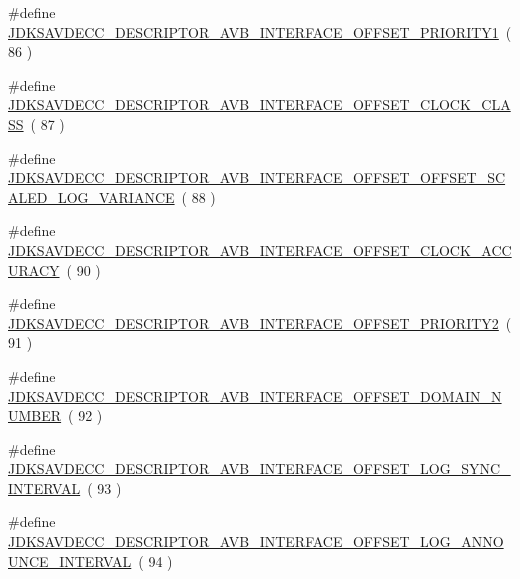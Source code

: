 \begin{DoxyCompactItemize}
\#define \hyperlink{group__descriptor__avb__interface_ga08c367bdbcb7eb2afffcf40741b96c4b}{J\+D\+K\+S\+A\+V\+D\+E\+C\+C\+\_\+\+D\+E\+S\+C\+R\+I\+P\+T\+O\+R\+\_\+\+A\+V\+B\+\_\+\+I\+N\+T\+E\+R\+F\+A\+C\+E\+\_\+\+O\+F\+F\+S\+E\+T\+\_\+\+P\+R\+I\+O\+R\+I\+T\+Y1}~( 86 )
\item 
\#define \hyperlink{group__descriptor__avb__interface_gaba4a7c757c0c64d925d94d8ee3412b33}{J\+D\+K\+S\+A\+V\+D\+E\+C\+C\+\_\+\+D\+E\+S\+C\+R\+I\+P\+T\+O\+R\+\_\+\+A\+V\+B\+\_\+\+I\+N\+T\+E\+R\+F\+A\+C\+E\+\_\+\+O\+F\+F\+S\+E\+T\+\_\+\+C\+L\+O\+C\+K\+\_\+\+C\+L\+A\+SS}~( 87 )
\item 
\#define \hyperlink{group__descriptor__avb__interface_gaea22e1c972b1f1f463cc8a6bfee79a94}{J\+D\+K\+S\+A\+V\+D\+E\+C\+C\+\_\+\+D\+E\+S\+C\+R\+I\+P\+T\+O\+R\+\_\+\+A\+V\+B\+\_\+\+I\+N\+T\+E\+R\+F\+A\+C\+E\+\_\+\+O\+F\+F\+S\+E\+T\+\_\+\+O\+F\+F\+S\+E\+T\+\_\+\+S\+C\+A\+L\+E\+D\+\_\+\+L\+O\+G\+\_\+\+V\+A\+R\+I\+A\+N\+CE}~( 88 )
\item 
\#define \hyperlink{group__descriptor__avb__interface_gab8c2aae0f698912c9e4680f653abc534}{J\+D\+K\+S\+A\+V\+D\+E\+C\+C\+\_\+\+D\+E\+S\+C\+R\+I\+P\+T\+O\+R\+\_\+\+A\+V\+B\+\_\+\+I\+N\+T\+E\+R\+F\+A\+C\+E\+\_\+\+O\+F\+F\+S\+E\+T\+\_\+\+C\+L\+O\+C\+K\+\_\+\+A\+C\+C\+U\+R\+A\+CY}~( 90 )
\item 
\#define \hyperlink{group__descriptor__avb__interface_ga0476918273925a628242baa7f8e05fe9}{J\+D\+K\+S\+A\+V\+D\+E\+C\+C\+\_\+\+D\+E\+S\+C\+R\+I\+P\+T\+O\+R\+\_\+\+A\+V\+B\+\_\+\+I\+N\+T\+E\+R\+F\+A\+C\+E\+\_\+\+O\+F\+F\+S\+E\+T\+\_\+\+P\+R\+I\+O\+R\+I\+T\+Y2}~( 91 )
\item 
\#define \hyperlink{group__descriptor__avb__interface_ga32056f1544d18e4ec2aa535ee2f8627b}{J\+D\+K\+S\+A\+V\+D\+E\+C\+C\+\_\+\+D\+E\+S\+C\+R\+I\+P\+T\+O\+R\+\_\+\+A\+V\+B\+\_\+\+I\+N\+T\+E\+R\+F\+A\+C\+E\+\_\+\+O\+F\+F\+S\+E\+T\+\_\+\+D\+O\+M\+A\+I\+N\+\_\+\+N\+U\+M\+B\+ER}~( 92 )
\item 
\#define \hyperlink{group__descriptor__avb__interface_ga013fce68add5f7fea4d904a379369852}{J\+D\+K\+S\+A\+V\+D\+E\+C\+C\+\_\+\+D\+E\+S\+C\+R\+I\+P\+T\+O\+R\+\_\+\+A\+V\+B\+\_\+\+I\+N\+T\+E\+R\+F\+A\+C\+E\+\_\+\+O\+F\+F\+S\+E\+T\+\_\+\+L\+O\+G\+\_\+\+S\+Y\+N\+C\+\_\+\+I\+N\+T\+E\+R\+V\+AL}~( 93 )
\item 
\#define \hyperlink{group__descriptor__avb__interface_gafbf1a0204a9c931b201fa4f23264abea}{J\+D\+K\+S\+A\+V\+D\+E\+C\+C\+\_\+\+D\+E\+S\+C\+R\+I\+P\+T\+O\+R\+\_\+\+A\+V\+B\+\_\+\+I\+N\+T\+E\+R\+F\+A\+C\+E\+\_\+\+O\+F\+F\+S\+E\+T\+\_\+\+L\+O\+G\+\_\+\+A\+N\+N\+O\+U\+N\+C\+E\+\_\+\+I\+N\+T\+E\+R\+V\+AL}~( 94 )

\end{DoxyCompactItemize}
